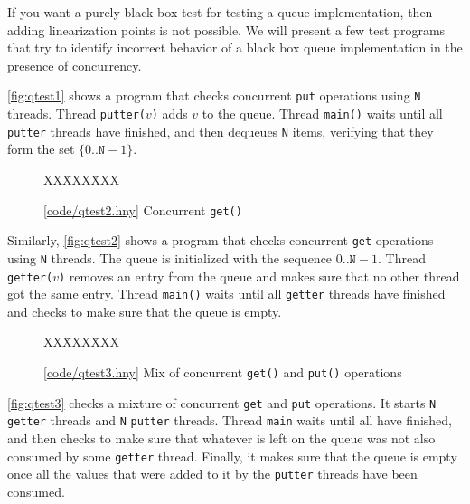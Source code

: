 \documentclass{report}
\newcommand{\harmonysource}[1]{
\begin{tabbing}
XX\=XXX\=XXX\kill
    
\end{tabbing}
}
\newcommand{\harmonylink}[1]{%
[\href{https://harmony.cs.cornell.edu/#1}{\underline{#1}}]%
}
\newenvironment{code}{
\tcolorbox
}{
\endtcolorbox
}
\begin{document}
If you want a purely black box test for testing a queue implementation,
then adding linearization points is not possible.
We will present a few test
programs that try to identify incorrect behavior of
a black box queue implementation in the presence of concurrency.

\autoref{fig:qtest1} shows a program that
checks concurrent \texttt{put} operations using
\texttt{N} threads.  Thread \texttt{putter($v$)}
adds $v$ to the queue.
Thread \texttt{main()} waits until all \texttt{putter}
threads have finished, and then dequeues \texttt{N}
items, verifying that they form the set
$\{ 0 .. \mathtt{N} - 1 \}$.

\begin{figure}
\begin{code}
\harmonysource{qtest2}
\end{code}
\caption{\harmonylink{code/qtest2.hny} Concurrent \texttt{get()}}
\label{fig:qtest2}
\end{figure}

Similarly, \autoref{fig:qtest2} shows a program that
checks concurrent \texttt{get} operations using
\texttt{N} threads.
The queue is initialized with the sequence
$0 .. \mathtt{N} - 1$.
Thread \texttt{getter($v$)} removes an entry from the
queue and makes sure that no other thread got the
same entry.
Thread \texttt{main()} waits until all \texttt{getter}
threads have finished and checks to make sure that
the queue is empty.

\begin{figure}
\begin{code}
\harmonysource{qtest3}
\end{code}
\caption{\harmonylink{code/qtest3.hny} Mix of concurrent
\texttt{get()} and \texttt{put()} operations}
\label{fig:qtest3}
\end{figure}

\autoref{fig:qtest3} checks a mixture of
concurrent \texttt{get} and \texttt{put} operations.
It starts \texttt{N} \texttt{getter} threads and
\texttt{N} \texttt{putter} threads.
Thread \texttt{main} waits until all have finished,
and then checks to make sure that whatever is left
on the queue was not also consumed by some
\texttt{getter} thread.
Finally, it makes sure that the queue is empty
once all the values that were added
to it by the \texttt{putter} threads have been consumed.
\end{document}
